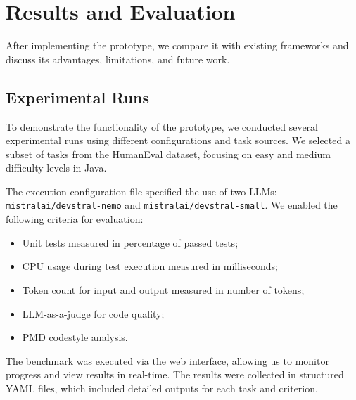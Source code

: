 \section{Results and Evaluation}

After implementing the prototype, we compare it with existing frameworks and discuss its advantages, limitations, and future work.

\subsection{Experimental Runs}

To demonstrate the functionality of the prototype, we conducted several experimental runs using different configurations and task sources.
We selected a subset of tasks from the HumanEval dataset, focusing on easy and medium difficulty levels in Java.

The execution configuration file specified the use of two LLMs: \texttt{mistralai/devstral-nemo} and \texttt{mistralai/devstral-small}.
We enabled the following criteria for evaluation:
\begin{itemize}
    \item Unit tests measured in percentage of passed tests;
    \item CPU usage during test execution measured in milliseconds;
    \item Token count for input and output measured in number of tokens;
    \item LLM-as-a-judge for code quality;
    \item PMD codestyle analysis.
\end{itemize}

The benchmark was executed via the web interface, allowing us to monitor progress and view results in real-time.
The results were collected in structured YAML files, which included detailed outputs for each task and criterion.


